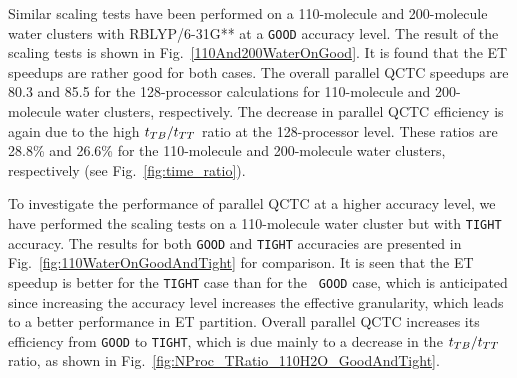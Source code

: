 \commentoutA{\documentclass[prl,aps,twocolumn,twocolumngrid,superbib]{revtex4}}
\begin{document}
Similar scaling tests have been performed on a 110-molecule and
200-molecule water clusters with RBLYP/6-31G** at a {\tt GOOD}
accuracy level.  The result of the scaling tests is shown in
Fig.~\ref{110And200WaterOnGood}. It is found that the ET speedups are
rather good for both cases. The overall parallel QCTC speedups are
80.3 and 85.5 for the 128-processor calculations for 110-molecule and
200-molecule water clusters, respectively.
The decrease in parallel QCTC efficiency is again due to the
high $t_{TB}/t_{TT}$ ratio at the 128-processor level. These ratios are
28.8\% and 26.6\% for the 110-molecule and 200-molecule water
clusters, respectively (see Fig.~\ref{fig:time_ratio}).

To investigate the performance of parallel QCTC at a higher accuracy
level, we have performed the scaling tests on a 110-molecule water
cluster but with {\tt TIGHT} accuracy\cite{CTymczak04a}. The results for both {\tt GOOD}
and {\tt TIGHT} accuracies are presented in
Fig.~\ref{fig:110WaterOnGoodAndTight} for comparison.  It is seen that
the ET speedup is better for the {\tt TIGHT} case than for the {\tt
GOOD} case, which is anticipated since increasing the accuracy level
increases the effective granularity, which leads to a better
performance in ET partition\cite{CGan03}.  Overall parallel QCTC
increases its efficiency from {\tt GOOD} to {\tt TIGHT}, which is due
mainly to a decrease in the $t_{TB}/t_{TT}$ ratio, as shown in
Fig.~\ref{fig:NProc_TRatio_110H2O_GoodAndTight}.


\end{document}

